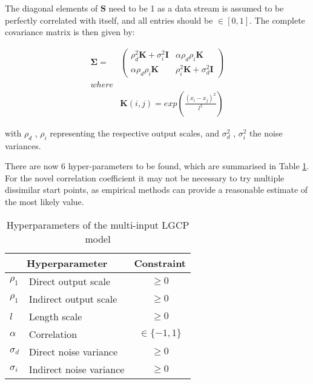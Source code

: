 \documentclass[a4paper,11pt]{report}
\begin{document}
The diagonal elements of \(\mathbf{S}\) need to be 1 as a data stream is assumed to be perfectly correlated with itself, and all entries should be \(\in [0,1]\). The complete covariance matrix is then given by:

\begin{equation} \label{eq:LGCPCcovariance}
\begin{aligned}
\boldsymbol{\Sigma} =&  \left( \begin{array}{cc}
\rho_d^2 \mathbf{K} + \sigma_i^2 \mathbf{I} & \alpha \rho_d \rho_i \mathbf{K}  \\
\alpha \rho_d \rho_i \mathbf{K} & \rho_i^2 \mathbf{K} + \sigma_d^2 \mathbf{I} \end{array} \right) \\ where\\
&\mathbf{K}(i,j) = exp\left( \frac{(x_i-x_j)^2}{l^2}\right)
\end{aligned}
\end{equation}

with \(\rho_d\) , \(\rho_i\) representing the respective output scales, and \(\sigma_d^2\) , \(\sigma_i^2\) the noise variances.

There are now 6 hyper-parameters to be found, which are summarised in Table \ref{LGCPChyperparameters}. For the novel correlation coefficient it may not be necessary to try multiple dissimilar start points, as empirical methods can provide a reasonable estimate of the most likely value. \\

\begin{table}[]
\centering
\caption{Hyperparameters of the multi-input LGCP model}
\label{LGCPChyperparameters}
\begin{tabular}{ll|c}
\multicolumn{2}{c|}{\textbf{Hyperparameter}} & \textbf{Constraint} \\ \hline
\(\rho_1\)           & Direct output scale             & \(\geq0\)            \\
\(\rho_1\)             & Indirect output scale           & \(\geq0\)            \\
\(l\)          & Length scale                    & \(\geq0\)            \\
\(\alpha\)             & Correlation                     &  \(\in\{-1,1\}\)                   \\
\(\sigma_d\)             & Direct noise variance           &    \(\geq0\)                 \\
\(\sigma_i\)           & Indirect noise variance         &     \(\geq0\)               
\end{tabular}
\end{table}
\end{document}
